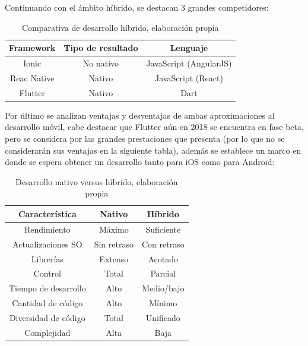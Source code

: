 Continuando con el ámbito híbrido, se destacan 3 grandes competidores:

\begin{table}[H]
	\centering
	\begin{tabular}{| c | c | c |}
		\hline
		\multicolumn{1}{|c|}{\textbf{Framework}}&
		\multicolumn{1}{c|}{\textbf{Tipo de resultado}}&
		\multicolumn{1}{|c|}{\textbf{Lenguaje}}\\ \hline
		Ionic  & No nativo  & JavaScript (AngularJS) \\ \hline
		Reac Native  & Nativo & JavaScript (React) \\ \hline
		Flutter  & Nativo & Dart \\ \hline
	\end{tabular}
	\caption{Comparativa de desarrollo híbrido, elaboración propia}
	\label{hybrid_comparative}
\end{table}

Por último se analizan ventajas y desventajas de ambas aproximaciones al desarrollo móvil, cabe destacar que Flutter aún en 2018 se encuentra en fase beta, pero se considera por las grandes prestaciones que presenta (por lo que no se considerarán sus ventajas en la siguiente tabla), además se establece un marco en donde se espera obtener un desarrollo tanto para iOS como para Android:

\begin{table}[H]
	\centering
	\begin{tabular}{| c | c | c |}
		\hline
		\multicolumn{1}{|c|}{\textbf{Característica}}&
		\multicolumn{1}{c|}{\textbf{Nativo}}&
		\multicolumn{1}{|c|}{\textbf{Híbrido}}\\ \hline
		Rendimiento  & Máximo  & Suficiente \\ \hline
		Actualizaciones SO  & Sin retraso & Con retraso \\ \hline
		Librerías  & Extenso & Acotado \\ \hline
		Control  & Total & Parcial \\ \hline
		Tiempo de desarrollo  & Alto & Medio/bajo \\ \hline
		Cantidad de código  & Alto & Mínimo \\ \hline
		Diversidad de código  & Total & Unificado \\ \hline
		Complejidad  & Alta & Baja \\ \hline
	\end{tabular}
	\caption{Desarrollo nativo versus híbrido, elaboración propia}
	\label{native_hybrid}
\end{table}

